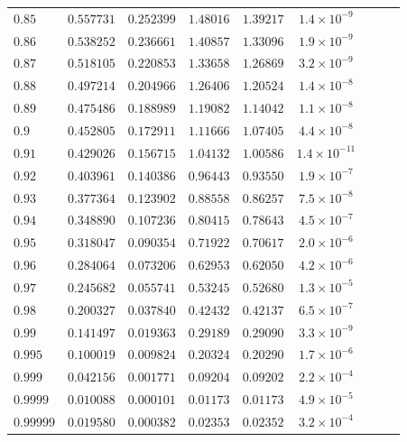 \documentclass[12pt]{extarticle}
\theoremstyle{plain}
\theoremstyle{remark}
\begin{document}
\begin{longtable}{lcccccccc}
$0.85$ & $0.557731$ & $0.252399$ & $1.48016$ & $1.39217$ & $1.4\times10^{-9}$ \\
$0.86$ & $0.538252$ & $0.236661$ & $1.40857$ & $1.33096$ & $1.9\times10^{-9}$ \\
$0.87$ & $0.518105$ & $0.220853$ & $1.33658$ & $1.26869$ & $3.2\times10^{-9}$ \\
$0.88$ & $0.497214$ & $0.204966$ & $1.26406$ & $1.20524$ & $1.4\times10^{-8}$ \\
$0.89$ & $0.475486$ & $0.188989$ & $1.19082$ & $1.14042$ & $1.1\times10^{-8}$ \\
$0.9$ & $0.452805$ & $0.172911$ & $1.11666$ & $1.07405$ & $4.4\times10^{-8}$ \\
$0.91$ & $0.429026$ & $0.156715$ & $1.04132$ & $1.00586$ & $1.4\times10^{-11}$ \\
$0.92$ & $0.403961$ & $0.140386$ & $0.96443$ & $0.93550$ & $1.9\times10^{-7}$ \\
$0.93$ & $0.377364$ & $0.123902$ & $0.88558$ & $0.86257$ & $7.5\times10^{-8}$ \\
$0.94$ & $0.348890$ & $0.107236$ & $0.80415$ & $0.78643$ & $4.5\times10^{-7}$ \\
$0.95$ & $0.318047$ & $0.090354$ & $0.71922$ & $0.70617$ & $2.0\times10^{-6}$ \\
$0.96$ & $0.284064$ & $0.073206$ & $0.62953$ & $0.62050$ & $4.2\times10^{-6}$ \\
$0.97$ & $0.245682$ & $0.055741$ & $0.53245$ & $0.52680$ & $1.3\times10^{-5}$ \\
$0.98$ & $0.200327$ & $0.037840$ & $0.42432$ & $0.42137$ & $6.5\times10^{-7}$ \\
$0.99$ & $0.141497$ & $0.019363$ & $0.29189$ & $0.29090$ & $3.3\times10^{-9}$ \\
$0.995$ & $0.100019$ & $0.009824$ & $0.20324$ & $0.20290$ & $1.7\times10^{-6}$ \\
$0.999$ & $0.042156$ & $0.001771$ & $0.09204$ & $0.09202$ & $2.2\times10^{-4}$ \\
$0.9999$ & $0.010088$ & $0.000101$ & $0.01173$ & $0.01173$ & $4.9\times10^{-5}$ \\
$0.99999$ & $0.019580$ & $0.000382$ & $0.02353$ & $0.02352$ & $3.2\times10^{-4}$ \\
\end{longtable}
\end{document}
